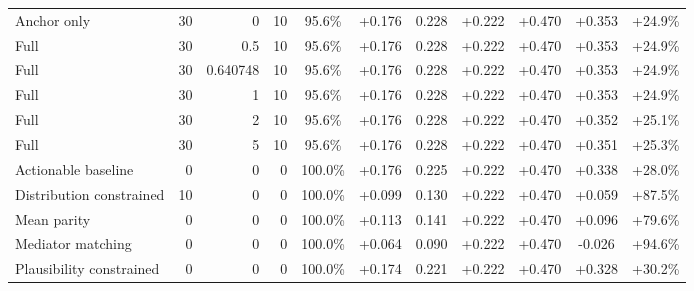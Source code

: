 \begin{table}[htbp]
\begin{tabular}{lrrrccccccc}
Anchor only & 30 & 0 & 10 & 95.6\% & +0.176 & 0.228 & +0.222 & +0.470 & +0.353 & +24.9\% \\
Full & 30 & 0.5 & 10 & 95.6\% & +0.176 & 0.228 & +0.222 & +0.470 & +0.353 & +24.9\% \\
Full & 30 & 0.640748 & 10 & 95.6\% & +0.176 & 0.228 & +0.222 & +0.470 & +0.353 & +24.9\% \\
Full & 30 & 1 & 10 & 95.6\% & +0.176 & 0.228 & +0.222 & +0.470 & +0.353 & +24.9\% \\
Full & 30 & 2 & 10 & 95.6\% & +0.176 & 0.228 & +0.222 & +0.470 & +0.352 & +25.1\% \\
Full & 30 & 5 & 10 & 95.6\% & +0.176 & 0.228 & +0.222 & +0.470 & +0.351 & +25.3\% \\
Actionable baseline & 0 & 0 & 0 & 100.0\% & +0.176 & 0.225 & +0.222 & +0.470 & +0.338 & +28.0\% \\
Distribution constrained & 10 & 0 & 0 & 100.0\% & +0.099 & 0.130 & +0.222 & +0.470 & +0.059 & +87.5\% \\
Mean parity & 0 & 0 & 0 & 100.0\% & +0.113 & 0.141 & +0.222 & +0.470 & +0.096 & +79.6\% \\
Mediator matching & 0 & 0 & 0 & 100.0\% & +0.064 & 0.090 & +0.222 & +0.470 & -0.026 & +94.6\% \\
Plausibility constrained & 0 & 0 & 0 & 100.0\% & +0.174 & 0.221 & +0.222 & +0.470 & +0.328 & +30.2\% \\
\bottomrule
\end{tabular}
\end{table}
